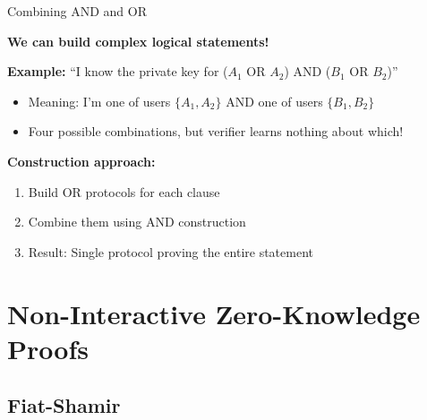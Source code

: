 \documentclass[aspectratio=169, lualatex, handout]{beamer}
\begin{document}
\begin{frame}{Combining AND and OR}
	\begin{center}
		\textbf{We can build complex logical statements!}
	\end{center}
	\vspace{0.5em}
	\textbf{Example:} ``I know the private key for ($A_1$ OR $A_2$) AND ($B_1$ OR $B_2$)''
	\begin{itemize}
		\item Meaning: I'm one of users $\{A_1, A_2\}$ AND one of users $\{B_1, B_2\}$
		\item Four possible combinations, but verifier learns nothing about which!
	\end{itemize}
	\vspace{0.5em}
	\textbf{Construction approach:}
	\begin{enumerate}
		\item Build OR protocols for each clause
		\item Combine them using AND construction
		\item Result: Single protocol proving the entire statement
	\end{enumerate}
\end{frame}

\section{Non-Interactive Zero-Knowledge Proofs}

\subsection{Fiat-Shamir}
\end{document}
